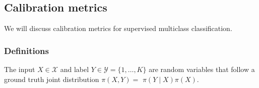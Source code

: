 
\subsection{Calibration metrics}
We will discuss calibration metrics for supervised multiclass classification.

\subsubsection{Definitions}
The input $X \in \mathcal{X}$ and label $Y \in \mathcal{Y}=\{1, \ldots, K\}$ are random variables that follow a ground truth joint distribution $\pi(X, Y)=$ $\pi(Y \mid X) \pi(X)$.



